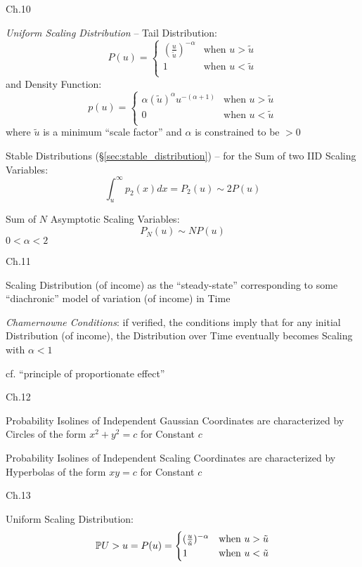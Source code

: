 Ch.10

\emph{Uniform Scaling Distribution} -- Tail Distribution:
\[
  P(u) = \begin{cases}
    (\frac{u}{\tilde{u}})^{-\alpha} & \text{when } u > \tilde{u} \\
    1                               & \text{when } u < \tilde{u} \\
  \end{cases}
\]
and Density Function:
\[
  p(u) = \begin{cases}
    \alpha(\tilde{u})^\alpha u^{-(\alpha+1)} & \text{when } u > \tilde{u} \\
    0                                        & \text{when } u < \tilde{u} \\
  \end{cases}
\]
where $\tilde{u}$ is a minimum ``scale factor'' and $\alpha$ is constrained to
be $> 0$

Stable Distributions (\S\ref{sec:stable_distribution}) -- for the Sum of two
IID Scaling Variables:
\[
  \int_u^\infty p_2(x) dx = P_2(u) \sim 2 P(u)
\]

Sum of $N$ Asymptotic Scaling Variables:
\[
  P_N(u) \sim N P(u)
\]
$0 < \alpha < 2$

Ch.11

Scaling Distribution (of income) as the ``steady-state'' corresponding to some
``diachronic'' model of variation (of income) in Time

\emph{Chamernowne Conditions}: if verified, the conditions imply that for any
initial Distribution (of income), the Distribution over Time eventually becomes
Scaling with $\alpha < 1$

cf. ``principle of proportionate effect''

Ch.12

Probability Isolines of Independent Gaussian Coordinates are characterized by
Circles of the form $x^2 + y^2 = c$ for Constant $c$

Probability Isolines of Independent Scaling Coordinates are characterized by
Hyperbolas of the form $x y = c$ for Constant $c$

Ch.13

Uniform Scaling Distribution:
\[
  \mathbb{P}{U > u} = P(u) = \begin{cases}
    (\frac{u}{\tilde{u}})^{-\alpha} & \text{when } u > \tilde{u} \\
    1                               & \text{when } u < \tilde{u} \\
  \end{cases}
\]


